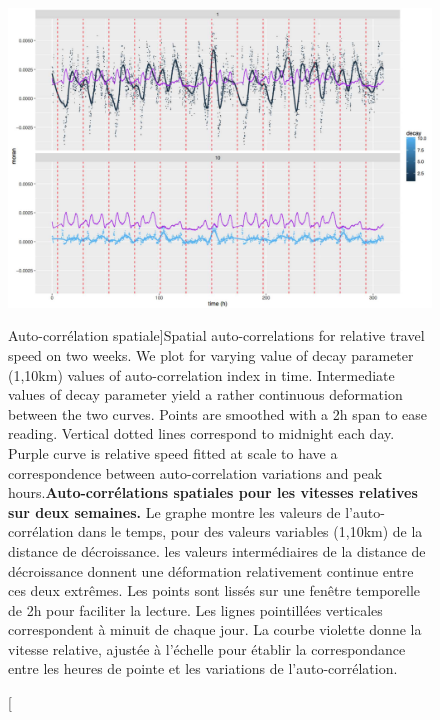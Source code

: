 \begin{figure}
\includegraphics[width=\linewidth]{Figures/Final/8-1-2-fig-transportationequilibrium-fig-5.jpg}
\caption[Spatial auto-correlations for relative travel speed][Auto-corrélation spatiale]{Spatial auto-correlations for relative travel speed on two weeks. We plot for varying value of decay parameter (1,10km) values of auto-correlation index in time. Intermediate values of decay parameter yield a rather continuous deformation between the two curves. Points are smoothed with a 2h span to ease reading. Vertical dotted lines correspond to midnight each day. Purple curve is relative speed fitted at scale to have a correspondence between auto-correlation variations and peak hours.\label{fig:transportationequilibrium:fig-5}}{\textbf{Auto-corrélations spatiales pour les vitesses relatives sur deux semaines.} Le graphe montre les valeurs de l'auto-corrélation dans le temps, pour des valeurs variables (1,10km) de la distance de décroissance. les valeurs intermédiaires de la distance de décroissance donnent une déformation relativement continue entre ces deux extrêmes. Les points sont lissés sur une fenêtre temporelle de 2h pour faciliter la lecture. Les lignes pointillées verticales correspondent à minuit de chaque jour. La courbe violette donne la vitesse relative, ajustée à l'échelle pour établir la correspondance entre les heures de pointe et les variations de l'auto-corrélation.\label{fig:transportationequilibrium:fig-5}}
\end{figure}




